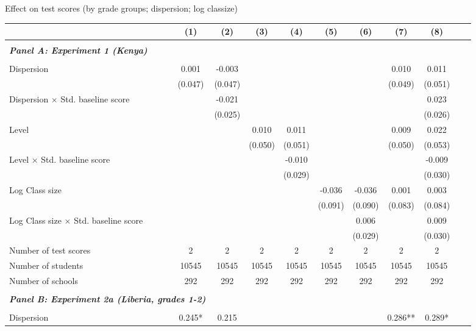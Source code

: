 \begin{center} 
\caption{\small Effect on test scores (by grade groups; dispersion; log classize)} 
\label{tab:descriptives} 
\begin{scriptsize}
\begin{threeparttable}
\begin{tabular} {@{} l l c c c c c c c c c c  @{}} \toprule \toprule
& &(1)&(2)&(3)&(4)&(5)&(6)&(7)&(8) \\ \midrule 
\\
\multicolumn{3}{l}{\textbf{\textit{Panel A: Experiment 1 (Kenya)}}} \\
\\
Dispersion &  & 0.001 & -0.003 &  &  &  &  & 0.010 & 0.011 \\
                 &  & (0.047) & (0.047) &  &  &  &  & (0.049) & (0.051) \\
Dispersion $\times$ Std. baseline score &  &  & -0.021 &  &  &  &  &  & 0.023 \\
                 &  &  & (0.025) &  &  &  &  &  & (0.026) \\
Level &  &  &  & 0.010 & 0.011 &  &  & 0.009 & 0.022 \\
                 &  &  &  & (0.050) & (0.051) &  &  & (0.050) & (0.053) \\
Level $\times$ Std. baseline score &  &  &  &  & -0.010 &  &  &  & -0.009 \\
                 &  &  &  &  & (0.029) &  &  &  & (0.030) \\
Log Class size &  &  &  &  &  & -0.036 & -0.036 & 0.001 & 0.003 \\
                 &  &  &  &  &  & (0.091) & (0.090) & (0.083) & (0.084) \\
Log Class size $\times$ Std. baseline score &  &  &  &  &  &  & 0.006 &  & 0.009 \\
                 &  &  &  &  &  &  & (0.029) &  & (0.030) \\
\midrule
Number of test scores &  & 2 & 2 & 2 & 2 & 2 & 2 & 2 & 2 \\
Number of students &  & 10545 & 10545 & 10545 & 10545 & 10545 & 10545 & 10545 & 10545 \\
Number of schools &  & 292 & 292 & 292 & 292 & 292 & 292 & 292 & 292 \\
 \midrule
\\
\multicolumn{3}{l}{\textbf{\textit{Panel B: Experiment 2a (Liberia, grades 1-2)}}} \\
\\
Dispersion &  & 0.245* & 0.215 &  &  &  &  & 0.286** & 0.289* \\

\end{tabular}
\end{threeparttable}
\end{scriptsize}
\end{center}
